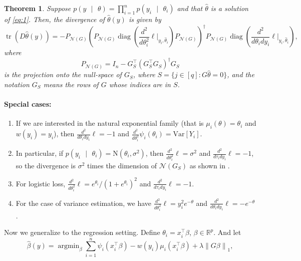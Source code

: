 \documentclass[11pt]{article}
\DeclareMathOperator*{\argmin}{argmin}
\newcommand{\norm}[1]{\left\lVert #1 \right\rVert}
\newcommand{\R}{\mathbb{R}}
\newcommand{\given}{\mbox{ }\vert\mbox{ }}
\renewcommand{\hat}{\widehat}
\DeclareMathOperator*{\trace}{tr}
\DeclareMathOperator*{\diag}{diag}
\newcommand{\Pnd}{P_{\mathcal{N}(G)}}
\theoremstyle{plain}
\newtheorem{theorem}{Theorem}
\begin{document}
\begin{theorem}
\label{thm:simple-divergence}
  Suppose $p(y \given \theta) = \prod_{i=1}^n p(y_i \given \theta_i)$
  and that $\hat{\theta}$ is a solution of \eqref{eq:1}. Then, the
  divergence of $\hat\theta(y)$ is given by 
  \begin{equation}
    \label{eq:2}
    \trace\left(D \hat\theta(y)\right) = -\Pnd \left(\Pnd
      \diag\left(\frac{d^2}{d\theta_i^2}\ell
        \bigg\vert_{y_i,\hat{\theta}_i}\right) \Pnd\right)^\dagger \Pnd
      \diag\left(\frac{d^2}{d\theta_i d y_i} \ell \bigg\vert_{y_i,\hat{\theta}_i}\right),
    \end{equation}
    where 
    \begin{equation}
      \label{eq:3}
      \Pnd = I_n - G_S^\top (G_S^\top G_S)^\dagger G_S
    \end{equation}
    is the projection onto the null-space of $G_S$, where $S = \{j \in
    [q] : G\hat\theta = 0\}$, and the notation $G_S$ means the rows of
    $G$ whose indices are in $S$.
\end{theorem}


\paragraph{Special cases:}
\begin{enumerate}
\item If we are interested in the natural exponential family (that is
  $\mu_i(\theta)=\theta_i$ and $w(y_i)=y_i$), then $\frac{d^2}{d\theta_i d y_i} \ell = -1$
  and $\frac{d^2}{d\theta_i^2}\psi_i(\theta_i) = \textrm{Var}[Y_i]$.
\item In particular, if $p(y_i \given \theta_i) = \mbox{N}(\theta_i, \sigma^2)$, then $\frac{d^2}{d\theta_i^2}\ell = \sigma^2$
  and $\frac{d^2}{d\tau_i d y_i} \ell = -1$, so the divergence is
  $\sigma^2$ times the
  dimension of $\mathcal{N}(G_S)$ as shown in
  \citet{TibshiraniTaylor2012}. 
\item For logistic loss, $\frac{d^2}{d\theta_i^2}\ell =
  e^{\theta_i}/(1+e^{\theta_i})^2$ and 
  $\frac{d^2}{d\tau_i d y_i} \ell = -1$.
\item For the case of variance estimation, we have $\frac{d^2}{d\theta_i^2}\ell =
  y^2_ie^{-\theta}$ and 
  $\frac{d^2}{d\theta_i d y_i} \ell = -e^{-\theta}$.
\end{enumerate}

Now we generalize to the regression setting. Define
$\theta_i = x_i^\top \beta$, $\beta \in \R^p$. And let
\begin{equation}
  \label{eq:7}
   \hat\beta(y) = \argmin_\beta \sum_{i=1}^n \psi_i(x_i^\top \beta) -
   w(y_i)\mu_i(x_i^\top \beta) + \lambda\norm{G\beta}_1,
\end{equation}
\end{document}
